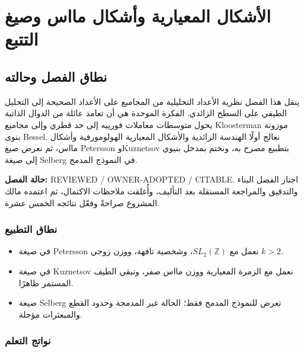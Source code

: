 \chapter{الأشكال المعيارية وأشكال مااس وصيغ التتبع}
\label{ch:modular-maass-trace-formulas}

\section*{نطاق الفصل وحالته}

ينقل هذا الفصل نظرية الأعداد التحليلية من المجاميع على الأعداد الصحيحة إلى
التحليل الطيفي على السطح الزائدي. الفكرة الموحدة هي أن تعامد عائلة من
الدوال الذاتية يحول متوسطات معاملات فورييه إلى حد قطري وإلى مجاميع
Kloosterman موزونة بنوى Bessel. نعالج أولًا الهندسة الزائدية والأشكال
المعيارية الهولومورفية وأشكال مااس، ثم نعرض صيغ Petersson وKuznetsov
بتطبيع مصرح به، ونختم بمدخل بنيوي إلى صيغة Selberg في النموذج المدمج.

\noindent\textbf{حالة الفصل:}
\textenglish{REVIEWED / OWNER-ADOPTED / CITABLE}. اجتاز الفصل البناء
والتدقيق والمراجعة المستقلة بعد التأليف، وأُغلقت ملاحظات الاكتمال، ثم
اعتمده مالك المشروع صراحةً وفعّل نتائجه الخمس عشرة.

\subsection*{نطاق التطبيع}

\begin{itemize}
  \item في صيغة Petersson نعمل مع \(SL_2(\mathbb Z)\)، وشخصية تافهة،
  ووزن زوجي \(k>2\).
  \item في صيغة Kuznetsov نعمل مع الزمرة المعيارية ووزن مااس صفر،
  ونبقي الطيف المستمر ظاهرًا.
  \item صيغة Selberg تعرض للنموذج المدمج فقط؛ الحالة غير المدمجة وحدود
  القطع والمبعثرات مؤجلة.
\end{itemize}

\subsection*{نواتج التعلم}

